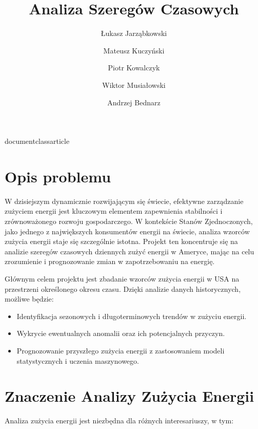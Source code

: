 documentclass{article}
\usepackage{parskip}
\usepackage[utf8]{inputenc} 
\usepackage[T1]{fontenc} %
\usepackage[polish]{babel} %
\usepackage{datetime2} %



\title{Analiza Szeregów Czasowych}
\author{
    Łukasz Jarząbkowski \and
    Mateusz Kuczyński \and
    Piotr Kowalczyk \and
    Wiktor Musiałowski \and
    Andrzej Bednarz
}
\date{} %

\maketitle

\section{Opis problemu}

W dzisiejszym dynamicznie rozwijającym się świecie, efektywne zarządzanie zużyciem energii jest kluczowym elementem zapewnienia stabilności i zrównoważonego rozwoju gospodarczego. W kontekście Stanów Zjednoczonych, jako jednego z największych konsumentów energii na świecie, analiza wzorców zużycia energii staje się szczególnie istotna. Projekt ten koncentruje się na analizie szeregów czasowych dziennych zużyć energii w Ameryce, mając na celu zrozumienie i prognozowanie zmian w zapotrzebowaniu na energię.

Głównym celem projektu jest zbadanie wzorców zużycia energii w USA na przestrzeni określonego okresu czasu. Dzięki analizie danych historycznych, możliwe będzie:

\begin{itemize}
    \item Identyfikacja sezonowych i długoterminowych trendów w zużyciu energii.
    \item Wykrycie ewentualnych anomalii oraz ich potencjalnych przyczyn.
    \item Prognozowanie przyszłego zużycia energii z zastosowaniem modeli statystycznych i uczenia maszynowego.
\end{itemize}

\section{Znaczenie Analizy Zużycia Energii}

Analiza zużycia energii jest niezbędna dla różnych interesariuszy, w tym:

